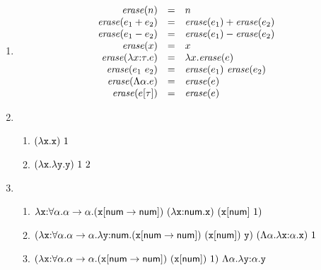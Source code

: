 \textbf{}
\begin{enumerate}
  \item
    \[
      \begin{array}{rcl}
        \mbox{\emph{erase}}(n)&=&n \\
        \mbox{\emph{erase}}(e_1+e_2)&=&\mbox{\emph{erase}}(e_1)+\mbox{\emph{erase}}(e_2) \\
        \mbox{\emph{erase}}(e_1-e_2)&=&\mbox{\emph{erase}}(e_1)-\mbox{\emph{erase}}(e_2) \\
        \mbox{\emph{erase}}(x)&=&x \\
        \mbox{\emph{erase}}(\lambda x{:}\tau.e)&=&\lambda x.\mbox{\emph{erase}}(e) \\
        \mbox{\emph{erase}}(e_1\ e_2)&=&\mbox{\emph{erase}}(e_1)\ \mbox{\emph{erase}}(e_2) \\
        \mbox{\emph{erase}}(\Lambda\alpha.e)&=&\mbox{\emph{erase}}(e) \\
        \mbox{\emph{erase}}(e[\tau])&=&\mbox{\emph{erase}}(e) \\
      \end{array}
    \]
  \item
    \begin{enumerate}
      \item $(\lambda\texttt{x}.\texttt{x})\ 1$
      \item $(\lambda\texttt{x}.\lambda\texttt{y}.\texttt{y})\ 1\ 2$
    \end{enumerate}
  \item
    \begin{enumerate}
      \item
        $\lambda\texttt{x}{:}\forall\alpha.\alpha\rightarrow\alpha.(\texttt{x}[\textsf{num}\rightarrow\textsf{num}])\ (\lambda\texttt{x}{:}\textsf{num}.\texttt{x})\ (\texttt{x}[\textsf{num}]\ 1)$
      \item
        $
          (\lambda\texttt{x}{:}\forall\alpha.\alpha\rightarrow\alpha.\lambda\texttt{y}{:}\textsf{num}.(\texttt{x}[\textsf{num}\rightarrow\textsf{num}])\ (\texttt{x}[\textsf{num}])\ \texttt{y})\ (\Lambda\alpha.\lambda\texttt{x}{:}\alpha.\texttt{x})
        \ 1$
      \item
        $(\lambda\texttt{x}{:}\forall\alpha.\alpha\rightarrow\alpha.(\texttt{x}[\textsf{num}\rightarrow\textsf{num}])\ (\texttt{x}[\textsf{num}])\ 1)\ \Lambda\alpha.\lambda\texttt{y}{:}\alpha.\texttt{y}$
    \end{enumerate}
\end{enumerate}

